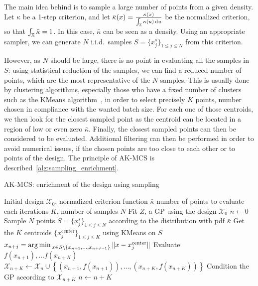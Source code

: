 \documentclass[../../Main_ManuscritThese.tex]{subfiles}
\begin{document}
The main idea behind %
is to sample a large number of points from a given density.  Let
$\kappa$ be a 1-step criterion, and let
$\bar{\kappa}(x) =
\frac{\kappa(x)}{\int_{\mathbb{X}}\kappa(u)\,\mathrm{d}u}$ be the
normalized criterion, so that $\int_{\mathbb{X}} \bar{\kappa}=1$. In this
case, $\bar{\kappa}$ can be seen as a density.  Using an appropriate
sampler, we can generate $N$ i.i.d.\ samples
$S=\{x_j^s\}_{1\leq j \leq N}$ from this criterion.

  
However, as $N$ should be large, there is no point in evaluating all
the samples in $S$: using statistical reduction of the samples, we can
find a reduced number of points, which are the most representative of
the $N$ samples. This is usually done by clustering algorithms,
especially those who have a fixed number of clusters such as the
KMeans algorithm~\cite{macqueen_methods_1967}, in order to select
precisely $K$ points, number chosen in compliance with the wanted
batch size. For each one of those centroids, we then look for the
closest sampled point as the centroid can be located in a region of
low or even zero $\bar{\kappa}$. Finally, the closest sampled points
can then be considered to be evaluated.  Additional filtering can then
be performed in order to avoid numerical issues, if the chosen points
are too close to each other or to points of the design.  The principle
of AK-MCS is described~\cref{alg:sampling_enrichment}.

\begin{algorithm}
\caption{AK-MCS: enrichment of the design using sampling}
\label{alg:sampling_enrichment}
\begin{algorithmic}
  \REQUIRE Initial design $\mathcal{X}_0$, normalized criterion function $\bar{\kappa}$
  \REQUIRE number of points to evaluate each iterations $K$, number of samples $N$
\STATE Fit $Z$, a GP using the design $\mathcal{X}_0$
\STATE $n \leftarrow 0$
\STATE Sample $N$ points $S = \{x^s_j\}_{1 \leq j \leq N}$ according to the distribution with pdf $\bar{\kappa}$
\STATE Get the $K$ centroids $\{x_j^{\mathrm{center}}\}_{1 \leq j \leq K}$ using KMeans on $S$
\STATE $x_{n+j}=\operatorname*{arg\,min \,}_{x \in S \setminus \{x_{n+1}, \dots, x_{n+j-1}\}} \|x - x_j^{\mathrm{center}} \|$
\ENDFOR
\STATE Evaluate $f(x_{n+1}),\dots f(x_{n+K})$
\STATE $\mathcal{X}_{n+K} \leftarrow \mathcal{X}_n \cup \left\{\left(x_{n+1}, f(x_{n+1})\right),\dots,  \left(x_{n+K}, f(x_{n+K})\right)\right\}$
\STATE Condition the GP according to $\mathcal{X}_{n+K}$
\STATE $n \leftarrow n + K$
\ENDWHILE
\end{algorithmic}
\end{algorithm}
\end{document}
